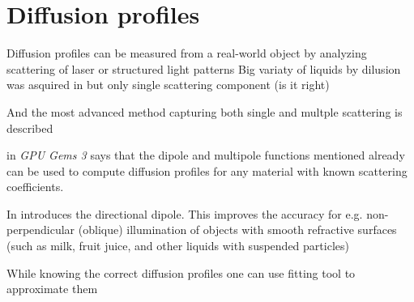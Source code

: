 \section{Diffusion profiles}
\begin{itemize}
    \item{Diffusion profiles can be measured from a real-world object by
    analyzing scattering of laser \cite{Jensen:2001:PMS:383259.383319} or
    structured light patterns \cite{tariq_efficient_2006-1} Big variaty of
    liquids by dilusion was asquired in
    \cite{Narasimhan:2006:ASP:1141911.1141986} but only single scattering
    component (is it right)
    \item{And the most advanced method capturing both single and multple
    scattering is described \cite{Gkioulekas:2013:IVR:2508363.2508377}}}
    \item{\cite{Nguyen:2007:GG:1407436} in \textit{GPU Gems 3} says that the
    dipole and multipole functions mentioned already can be used to compute
    diffusion profiles for any material with known scattering coefficients.
    \item{In \cite{Frisvad:2014:DDM:2702692.2682629} introduces the directional
    dipole}. This improves the accuracy for e.g. non-perpendicular (oblique)
    illumination of objects with smooth refractive surfaces (such as milk, fruit
    juice, and other liquids with suspended particles) }
    \item{While knowing the correct diffusion profiles one can use fitting tool
    to approximate them \cite{Nguyen:2007:GG:1407436}}
\end{itemize}
